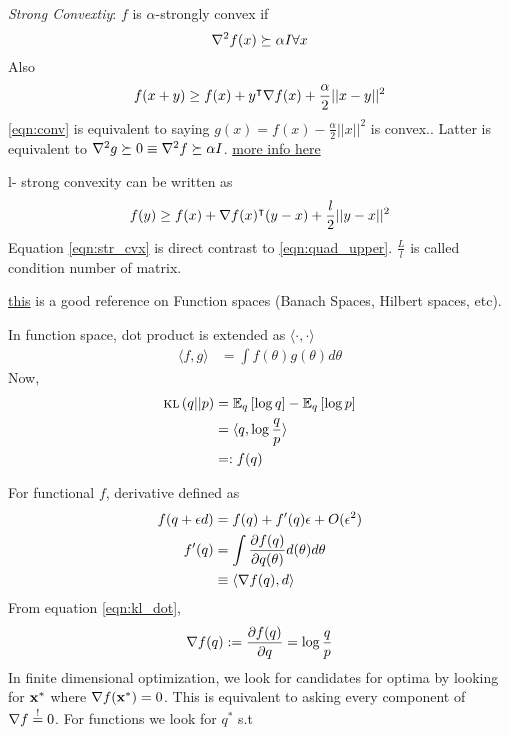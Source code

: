 \documentclass[summaries.tex]{subfiles}
\begin{document}
\emph{Strong Convextiy}: $f$ is $\alpha$-strongly convex if 
$$\nabla^2f(x) \succeq \alpha I \forall x$$
Also
\begin{equation} \label{eqn:conv}
  f(x + y) \geq f(x) + y^\intercal \nabla f(x) + \frac{\alpha}{2}||x-y||^2
\end{equation}
\ref{eqn:conv} is equivalent to saying $g(x) = f(x) - \frac{\alpha}{2}||x||^2$
is convex.. Latter is equivalent to $\nabla^2 g \succeq 0 \equiv \nabla^2 f \succeq \alpha I$.
\href{https://math.stackexchange.com/questions/673898/lipschitz-smoothness-strong-convexity-and-the-hessian}
{more info here} 

l- strong convexity can be written as 
\begin{equation}
  \label{eqn:str_cvx}
  f(y) \geq f(x) + \nabla f(x)^\intercal (y-x) + \frac{l}{2}||y-x||^2
\end{equation}
Equation \ref{eqn:str_cvx} is direct contrast to \ref{eqn:quad_upper}. 
$\frac{L}{l}$ is called condition number of matrix.

\href{https://pdfs.semanticscholar.org/f4c7/e5f8ce51f19be24c765f2e98481eca71e55f.pdf}
{this} is a good reference on Function spaces (Banach Spaces, Hilbert spaces, etc).

\INPROGRESS
In function space, dot product is extended as $\langle \cdot, \cdot \rangle$ 
\begin{align*}
    \langle f, g \rangle &= \int f(\theta) g(\theta) d\theta 
\end{align*}
Now,
\begin{align}
    \textsc{kl}\left(q||p\right) &= \mathbb{E}_{q}\left[\log q\right] - \mathbb{E}_{q}\left[\log p\right] \nonumber\\
              &= \langle q, \log \frac{q}{p} \rangle \label{eqn:kl_dot}\\
              &=: f(q) \nonumber
\end{align}

For functional $f$, derivative defined as
\begin{align}
    f(q + \epsilon d) &= f(q) + f^\prime(q)\epsilon + O(\epsilon^2)\\
          f^\prime(q) &= \int \frac{\partial f(q)}{\partial q(\theta)} d(\theta) d\theta\\
                      &\equiv \langle \nabla f(q), d \rangle 
\end{align}
From equation \ref{eqn:kl_dot}, 
\begin{equation}
    \nabla f(q) := \frac{\partial f(q)}{\partial q} = \log \frac{q}{p}
\end{equation}
In finite dimensional optimization, we look for candidates for optima by looking for $\mathbf{x}^\ast$ where
$\nabla f(\mathbf{x}^\ast) = 0$. This is equivalent to asking every component of $\nabla f \overset{!}{=} 0$. For
functions we look for $q^\ast$ s.t 
\end{document}
